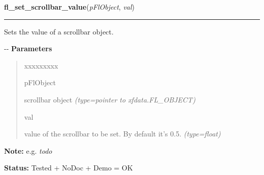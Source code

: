     \vspace{0.5ex}

\hspace{.8\funcindent}\begin{boxedminipage}{\funcwidth}

    \raggedright \textbf{fl\_set\_scrollbar\_value}(\textit{pFlObject}, \textit{val})

    \vspace{-1.5ex}

    \rule{\textwidth}{0.5\fboxrule}
\setlength{\parskip}{2ex}

Sets the value of a scrollbar object.

-{}-
\setlength{\parskip}{1ex}
      \textbf{Parameters}
      \vspace{-1ex}

      \begin{quote}
        \begin{Ventry}{xxxxxxxxx}

          \item[pFlObject]


scrollbar object
            {\it (type=pointer to xfdata.FL\_OBJECT)}

          \item[val]


value of the scrollbar to be set. By default it's 0.5.
            {\it (type=float)}

        \end{Ventry}

      \end{quote}

\textbf{Note:} 
e.g. \emph{todo}


\textbf{Status:} 
Tested + NoDoc + Demo = OK


    \end{boxedminipage}

    \label{xformslib:flscrollbar:fl_set_scrollbar_size}

    \vspace{0.5ex}

